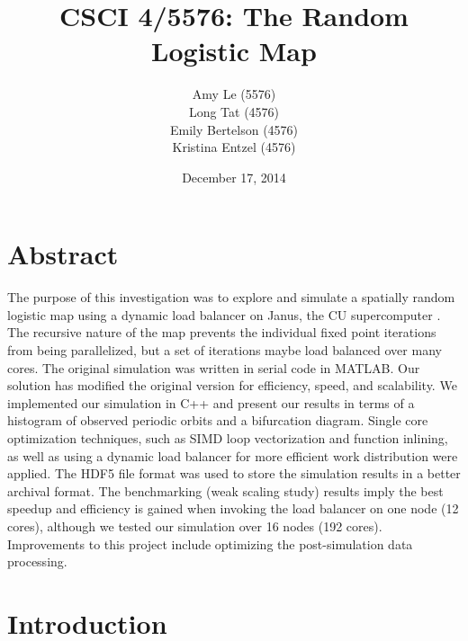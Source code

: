 \documentclass[12pt]{article}
\begin{document}
\pagestyle{plain} %
\title{CSCI 4/5576: The Random Logistic Map}
\date{December 17, 2014}
\author{Amy Le (5576)\\Long Tat (4576)\\Emily Bertelson (4576)\\Kristina Entzel (4576)}
\maketitle
\section{Abstract}
The purpose of this investigation was to explore and simulate a
spatially random logistic map using a dynamic load balancer on Janus, the CU
supercomputer \cite{janus}. The recursive nature of the map prevents the individual
fixed point iterations from being parallelized, but a set of
iterations maybe load balanced over many cores. The original simulation was written in serial code in
MATLAB. Our solution has modified the original version for efficiency,
speed, and scalability. We implemented our simulation in C++ and present our
results in terms of a histogram of observed periodic orbits and a
bifurcation diagram. Single core optimization techniques,
such as SIMD loop vectorization and function inlining, as well as
using a dynamic load balancer for more efficient work distribution
were applied. The HDF5 file format was used to store the simulation results in a better archival format. The benchmarking (weak scaling study) results imply the best
speedup and efficiency is gained when invoking the load balancer on
one node (12 cores), although we tested our simulation over 16 nodes
(192 cores). Improvements to this project include optimizing the
post-simulation data processing. 
\section{Introduction}
\end{document}
